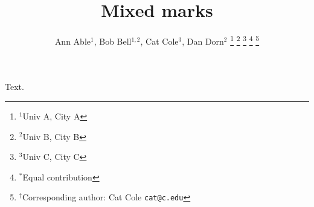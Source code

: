\documentclass[journal]{IEEEtran}
\begin{document}
\title{Mixed marks}
\author{Ann Able$^{1}$, Bob Bell$^{1,2}$,
Cat Cole$^{3}$, Dan Dorn$^{2}$%
\thanks{$^1$Univ A, City A}%
\thanks{$^2$Univ B, City B}%
\thanks{$^3$Univ C, City C}%
\thanks{$^{*}$Equal contribution}%
\thanks{$^{\dagger}$Corresponding author: Cat Cole {\tt cat@c.edu}}}
\maketitle
Text.
\end{document}
